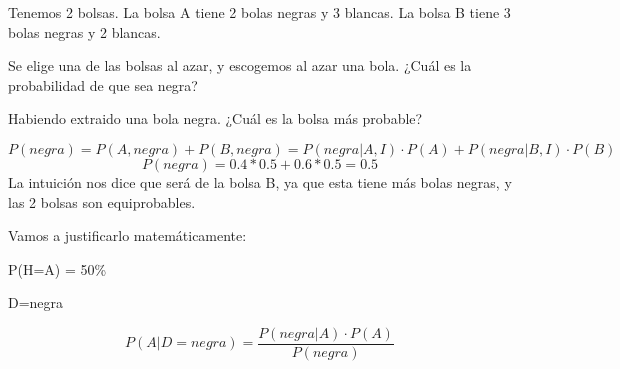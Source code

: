 \begin{problem}[4]
Tenemos 2 bolsas. La bolsa A tiene 2 bolas negras y 3 blancas. La bolsa B tiene 3 bolas negras y 2 blancas.

\ppart Se elige una de las bolsas al azar, y escogemos al azar una bola. ¿Cuál es la probabilidad de que sea negra?

\ppart Habiendo extraido una bola negra. ¿Cuál es la bolsa más probable?
\solution

\spart 
\[
P(negra) = P(A,negra) + P(B,negra) = P(negra|A,I)·P(A) + P(negra|B,I)·P(B)\]
\[
P(negra) = 0.4*0.5+0.6*0.5 = 0.5
\]
\spart La intuición nos dice que será de la bolsa B, ya que esta tiene más bolas negras, y las 2 bolsas son equiprobables.

Vamos a justificarlo matemáticamente:

P(H=A) = 50\%

D=negra

\[
P(A|D=negra) = \frac{P(negra|A)·P(A)}{P(negra)}
\]




\end{problem}